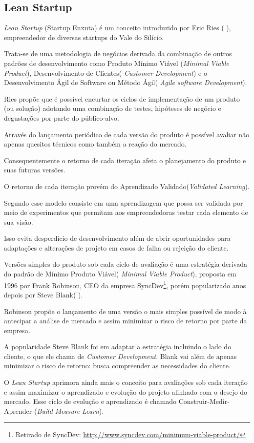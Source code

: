\subsection{Lean Startup}
\par \emph{Lean Startup} (Startup Enxuta) é um conceito introduzido por Eric Ries ( \cite{ries:11}), empreendedor de diversas startups do Vale do Silício.
\par Trata-se de uma metodologia de negócios derivada da combinação de outros padrões de desenvolvimento como Produto Mínimo Viável (\emph{Minimal Viable Product}), Desenvolvimento de Clientes( \emph{Customer Development}) e o Desenvolvimento Ágil de Software ou Método Ágil( \emph{Agile software Development}).
\par Ries propõe que é possível encurtar os ciclos de implementação de um produto (ou solução) adotando uma combinação de testes, hipóteses de negócio e degustações por parte do público-alvo. 
\par Através do lançamento periódico de cada versão do produto é possível avaliar não apenas quesitos técnicos como também a reação do mercado. 
\par Consequentemente o retorno de cada iteração afeta o planejamento do produto e suas futuras versões.
\par O retorno de cada iteração provém do Aprendizado Validado(\emph{Validated Learning}).
\par Segundo \cite{ries:11} esse modelo consiste em uma aprendizagem que possa ser validada por meio de experimentos que permitam aos empreendedoras testar cada elemento de sua visão.
\par Isso evita desperdício de desenvolvimento além de abrir oportunidades para adaptações e alterações de projeto em casos de falha ou rejeição do cliente.
\par Versões simples do produto sob cada ciclo de avaliação é uma estratégia derivada do padrão de Mínimo Produto Viável( \emph{Minimal Viable Product}), proposta em 1996 por Frank Robinson, CEO da empresa SyncDev\footnote{ Retirado de SyncDev: \url{http://www.syncdev.com/minimum-viable-product/}}, porém popularizado anos depois por Steve Blank( \cite{junk:2000}).
\par Robinson propõe o lançamento de uma versão o mais simples possível de modo à antecipar a análise de mercado e assim minimizar o risco de retorno por parte da empresa.
\par A popularidade Steve Blank foi em adaptar a estratégia incluindo o lado do cliente, o que ele chama de \emph{Customer Development}. Blank vai além de apenas minimizar o risco de retorno: busca compreender as necessidades do cliente.
\par O \emph{Lean Startup} aprimora ainda mais o conceito para avaliações sob cada iteração e assim maximizar o aprendizado e evolução do projeto alinhado com o desejo do mercado. Esse ciclo de evolução e aprendizado é chamado Construir-Medir-Aprender (\emph{Build-Measure-Learn}).

